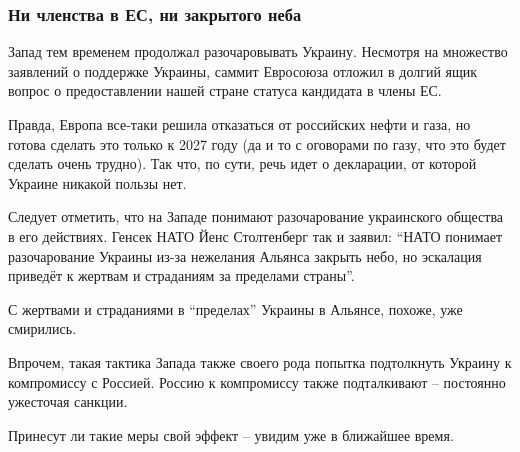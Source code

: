  
 
 
 
 

\subsubsection{Ни членства в ЕС, ни закрытого неба}

Запад тем временем продолжал разочаровывать Украину. Несмотря на множество
заявлений о поддержке Украины, саммит Евросоюза отложил в долгий ящик вопрос о
предоставлении нашей стране статуса кандидата в члены ЕС.

Правда, Европа все-таки решила отказаться от российских нефти и газа, но готова
сделать это только к 2027 году (да и то с оговорами по газу, что это будет
сделать очень трудно). Так что, по сути, речь идет о декларации, от которой
Украине никакой пользы нет.

Следует отметить, что на Западе понимают разочарование украинского общества в
его действиях. Генсек НАТО Йенс Столтенберг так и заявил: \enquote{НАТО понимает
разочарование Украины из-за нежелания Альянса закрыть небо, но эскалация
приведёт к жертвам и страданиям за пределами страны}.

С жертвами и страданиями в \enquote{пределах} Украины в Альянсе, похоже, уже смирились.

Впрочем, такая тактика Запада также своего рода попытка подтолкнуть Украину к
компромиссу с Россией. Россию к компромиссу также подталкивают – постоянно
ужесточая санкции.

Принесут ли такие меры свой эффект – увидим уже в ближайшее время.
